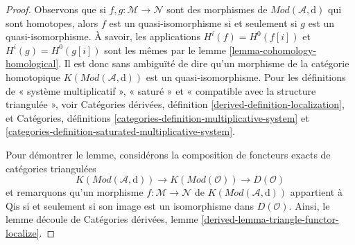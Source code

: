 \begin{proof}
Observons que si $f , g : \mathcal{M} \to \mathcal{N}$ sont des morphismes
de $\textit{Mod}(\mathcal{A}, \text{d})$ qui sont homotopes,
alors $f$ est un quasi-isomorphisme si et seulement si $g$ est un quasi-isomorphisme.
À savoir, les applications $H^i(f) = H^0(f[i])$ et $H^i(g) = H^0(g[i])$
sont les mêmes par le lemme \ref{lemma-cohomology-homological}.
Il est donc sans ambiguïté de dire qu'un morphisme de la
catégorie homotopique $K(\textit{Mod}(\mathcal{A}, \text{d}))$ est un
quasi-isomorphisme. Pour les définitions de « système multiplicatif »,
« saturé » et « compatible avec la structure triangulée
», voir Catégories dérivées, définition \ref{derived-definition-localization},
et
Catégories, définitions \ref{categories-definition-multiplicative-system}
et \ref{categories-definition-saturated-multiplicative-system}.

\medskip\noindent
Pour démontrer le lemme, considérons la composition de
foncteurs exacts de catégories triangulées
$$
K(\textit{Mod}(\mathcal{A}, \text{d}))
\longrightarrow
K(\textit{Mod}(\mathcal{O}))
\longrightarrow
D(\mathcal{O})
$$ et
remarquons qu'un morphisme $f : \mathcal{M} \to \mathcal{N}$ de
$K(\textit{Mod}(\mathcal{A}, \text{d}))$ appartient à $\text{Qis}$ si
et seulement si son image est un isomorphisme dans $D(\mathcal{O})$.
Ainsi, le lemme découle de Catégories dérivées, lemme
\ref{derived-lemma-triangle-functor-localize}.
\end{proof}


